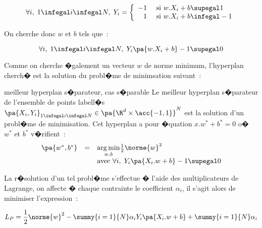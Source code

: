             $$
            \forall i, \; 1 \infegal i \infegal N, \; 
                        Y_i = \left\{ \begin{array}{rl}
                                                        -1 & \text{ si } w.X_i + b \supegal 1 \\ 
                                                         1 & \text{ si } w.X_i + b \infegal -1
                                                    \end{array} \right.
            $$

On cherche donc $w$ et $b$ tels que~:

            $$
            \forall i, \; 1 \infegal i \infegal N, \; 
                        Y_i \pa{ w.X_i + b} - 1 \supegal 0
            $$

Comme on cherche �galement un vecteur $w$ de norme minimum, l'hyperplan cherch� est la solution du probl�me de minimsation suivant~:


            \begin{xproblem}{meilleur hyperplan s�parateur, cas s�parable}\label{svm_problem_def}
            Le meilleur hyperplan s�parateur de l'ensemble de points labell�s
            $\pa{X_i,Y_i}_{1 \infegal i \infegal N} \in \pa{ \R^d \times \acc{-1,1} }^N$ est la solution
            d'un probl�me de minimisation. Cet hyperplan a pour �quation $x.w^* + b^* = 0$ o� 
            $w^*$ et $b^*$ v�rifient~:
                    $$
                    \begin{array}{rcl}    \pa{w^*,b^*} &=& \underset{w,b}{\arg \min} \frac{1}{2} \norme{w}^2 \\
                                         && \text{avec } \forall i, \; Y_i \pa{ X_i .w + b } -1 \supegal 0 
                    \end{array}                                        
                    $$
            \end{xproblem}


La r�solution d'un tel probl�me s'effectue � l'aide des multiplicateurs de Lagrange, on affecte � chaque contrainte le coefficient $\alpha_i$, il s'agit alors de minimiser l'expression~:

            \begin{eqnarray}
            L_P = \frac{1}{2} \norme{w}^2 - \summy{i=1}{N} \alpha_i Y_i \pa{ X_i . w + b } + \summy{i=1}{N} \alpha_i
            \label{svm_lagrange_lineaire}
            \end{eqnarray}

